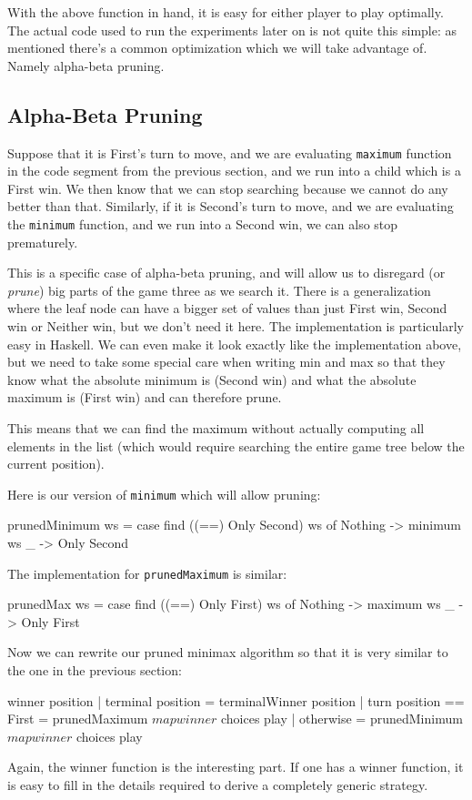 With the above function in hand, it is easy for either player to play optimally.
The actual code used to run the experiments later on is not quite this simple: as mentioned there's a common optimization which we will take advantage of.
Namely alpha-beta pruning.

\subsection {Alpha-Beta Pruning}
\label{sec:alpha_beta}

Suppose that it is First's turn to move, and we are evaluating \texttt{maximum} function in the code segment from the previous section, and we run into a child which is a First win.
We then know that we can stop searching because we cannot do any better than that.
Similarly, if it is Second's turn to move, and we are evaluating the \texttt{minimum} function, and we run into a Second win, we can also stop prematurely.

This is a specific case of alpha-beta pruning, and will allow us to disregard (or \emph{prune}) big parts of the game three as we search it.
There is a generalization where the leaf node can have a bigger set of values than just First win, Second win or Neither win, but we don't need it here.
The implementation is particularly easy in Haskell. We can even make it look exactly like the implementation above, but we need to take some special care when writing min and max so that they know what the absolute minimum is (Second win) and what the absolute maximum is (First win) and can therefore prune.

This means that we can find the maximum without actually computing all elements in the list (which would require searching the entire game tree below the current position).

Here is our version of \texttt{minimum} which will allow pruning:
\begin{code}
  prunedMinimum ws = 
    case find ((==) Only Second) ws of
      Nothing -> minimum ws
      _ -> Only Second
\end{code}
The implementation for \texttt{prunedMaximum} is similar:
\begin{code}
  prunedMax ws = 
    case find ((==) Only First) ws of
      Nothing -> maximum ws
      _ -> Only First
\end{code}
Now we can rewrite our pruned minimax algorithm so that it is very similar to the one in the previous section:
\begin{code}
  winner position
    | terminal position       = terminalWinner position
    | turn position == First  = prunedMaximum $ map winner $ choices play
    | otherwise               = prunedMinimum $ map winner $ choices play
\end{code}
Again, the winner function is the interesting part. If one has a winner function, it is easy to fill in the details required to derive a completely generic strategy.


